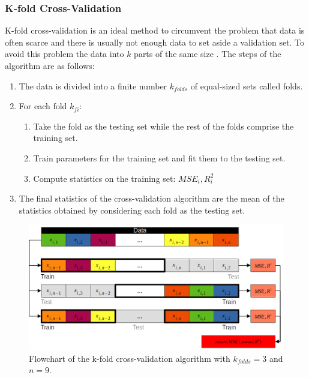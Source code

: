 \subsubsection{K-fold Cross-Validation}\label{subsubsec:cross_validation}
K-fold cross-validation is an ideal method to circumvent the problem that data is often scarce and there is usually not enough data to set aside a validation set. To avoid this problem the data into $k$ parts of the same size \cite{friedman2001elements}. \newline
The steps of the algorithm are as follows:
\begin{enumerate}
    \item The data is divided into a finite number $k_{folds}$ of equal-sized sets called folds.
    \item For each fold $k_{fi}$:
    \begin{enumerate}
        \item Take the fold as the testing set while the rest of the folds comprise the training set.
        \item Train parameters for the training set and fit them to the testing set.
        \item Compute statistics on the training set: $MSE_i, R^2_i$
    \end{enumerate}
    \item The final statistics of the cross-validation algorithm are the mean of the statistics obtained by considering each fold as the testing set.
\end{enumerate}
\begin{figure}[H]
    \centering
    \includegraphics[width=1\linewidth]{Images/cross_validation_diagram.png}
    \caption{Flowchart of the k-fold cross-validation algorithm with $k_{folds}=3$ and $n=9$.}
    \label{fig:cross_val_algorithm}
\end{figure}


